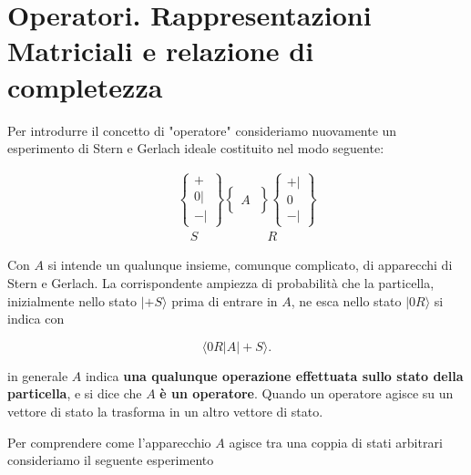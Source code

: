 \documentclass[a4paper,12pt,oneside]{book}
\begin{document}
\section[Operatori]{Operatori. Rappresentazioni Matriciali e relazione di completezza}

Per introdurre il concetto di "operatore" consideriamo nuovamente un esperimento di Stern e Gerlach ideale costituito nel modo seguente:

\begin{eqnarray}
& &\begin{Bmatrix}
 + \\ 0 | \\ - |  
\end{Bmatrix}
\begin{Bmatrix}
\quad \\  A  \\ \quad
\end{Bmatrix}
\begin{Bmatrix}
 +| \\ 0  \\ - |  
\end{Bmatrix}\\
& & \quad S  \ \qquad \quad\ \qquad R \nonumber
\end{eqnarray}

Con $A$ si intende un qualunque insieme, comunque complicato, di apparecchi di Stern e Gerlach. La corrispondente ampiezza di probabilità che la particella, inizialmente nello stato $| +S \rangle$ prima di entrare in $A$, ne esca nello stato $| 0R \rangle$ si indica con

\begin{equation}
\langle 0R|A| +S \rangle .
\end{equation}

in generale $A$ indica \textbf{una qualunque operazione effettuata sullo stato della particella}, e si dice che $A$ \textbf{è un operatore}. Quando un operatore agisce su un vettore di stato la trasforma in un altro vettore di stato.

Per comprendere come l'apparecchio $A$ agisce tra una coppia di stati arbitrari consideriamo il seguente esperimento
\end{document}
